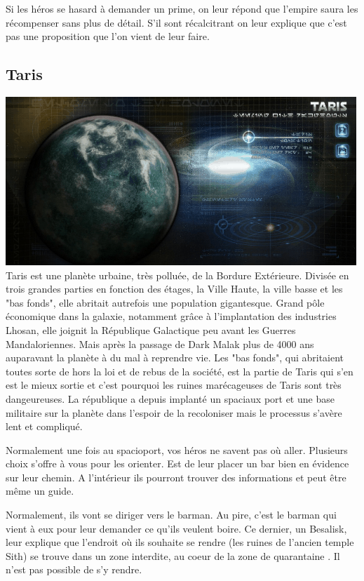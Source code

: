 Si les héros se hasard à demander un prime, on leur répond que l’empire saura les récompenser sans plus de détail. S’il sont récalcitrant on leur explique que c’est pas une proposition que l’on vient de leur faire.


\subsection{Taris} \label{sec:taris}
\noindent\includegraphics[width=\linewidth]{_img/dos-au-muur/taris.png}
Taris est une planète urbaine, très polluée, de la Bordure Extérieure. Divisée en trois grandes parties en fonction des étages, la Ville Haute, la ville basse et les "bas fonds", elle abritait autrefois une population gigantesque. Grand pôle économique dans la galaxie, notamment grâce à l’implantation des industries Lhosan, elle joignit la République Galactique peu avant les Guerres Mandaloriennes. Mais après la passage de Dark Malak plus de 4000 ans auparavant la planète à du mal à reprendre vie. Les "bas fonds", qui abritaient toutes sorte de hors la loi et de rebus de la société, est la partie de Taris qui s’en est le mieux sortie et c’est pourquoi les ruines marécageuses de Taris sont très dangeureuses. La république a depuis implanté un spaciaux port et une base militaire sur la planète dans l’espoir de la recoloniser mais le processus s’avère lent et compliqué.

Normalement une fois au spacioport, vos héros ne savent pas où aller. Plusieurs choix s’offre à vous pour les orienter. Est de leur placer un bar bien en évidence sur leur chemin. A l’intérieur ils pourront trouver des informations et peut être même un guide.

Normalement, ils vont se diriger vers le barman. Au pire, c’est le barman qui vient à eux pour leur demander ce qu’ils veulent boire. Ce dernier, un Besalisk, leur explique que l’endroit où ils souhaite se rendre (les ruines de l’ancien temple Sith) se trouve dans un zone interdite, au coeur de la zone de quarantaine . Il n’est pas possible de s’y rendre.

